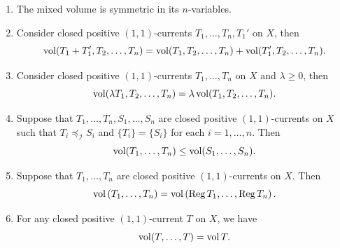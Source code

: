 \begin{proposition}\label{prop:vollinearlimit}\leavevmode
    \begin{enumerate}
        \item\label{itm:prop:vollinearlimit:1} The mixed volume is symmetric in its $n$-variables.
        \item\label{itm:prop:vollinearlimit:2} Consider closed positive $(1,1)$-currents $T_1,\ldots,T_n,T_1'$ on $X$, then
        \begin{equation}
            \operatorname{vol} (T_1+T_1',T_2,\ldots,T_n)=\operatorname{vol} (T_1,T_2,\ldots,T_n)+\operatorname{vol} (T_1',T_2,\ldots,T_n).
        \end{equation}
        \item\label{itm:prop:vollinearlimit:3} Consider closed positive $(1,1)$-currents $T_1,\ldots,T_n$ on $X$ and $\lambda\geq 0$, then
        \[
        \operatorname{vol} (\lambda T_1,T_2,\ldots,T_n)=\lambda \operatorname{vol} (T_1,T_2,\ldots,T_n).
        \]
        \item\label{itm:prop:vollinearlimit:4} Suppose that $T_1,\ldots,T_n,S_1,\ldots,S_n$ are closed positive $(1,1)$-currents on $X$ such that $T_i\preceq_{\mathcal{I}} S_i$ and $\{T_i\}=\{S_i\}$ for each $i=1,\ldots,n$. Then
        \begin{equation}
            \operatorname{vol}(T_1,\ldots,T_n)\leq \operatorname{vol}(S_1,\ldots,S_n).
        \end{equation}
        \item\label{itm:prop:vollinearlimit:5} Suppose that $T_1,\ldots,T_n$ are closed positive $(1,1)$-currents on $X$. Then
        \begin{equation}
            \operatorname{vol}\left(T_1,\ldots,T_n \right)=\operatorname{vol}\left(\operatorname{Reg} T_1,\ldots,\operatorname{Reg} T_n \right).
        \end{equation}
        \item\label{itm:prop:vollinearlimit:6} For any closed positive $(1,1)$-current $T$ on $X$, we have
        \begin{equation}\label{eq:mix_vol_ext_pure}
            \operatorname{vol}(T,\ldots,T)=\operatorname{vol} T.
        \end{equation}
    \end{enumerate}
\end{proposition}

